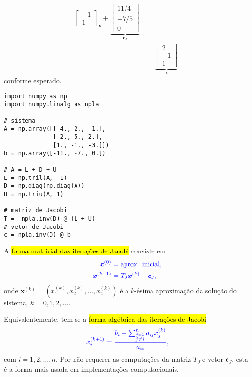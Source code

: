 \begin{ex}
\begin{align}
{\begin{bmatrix}
        -1 \\
        1             
      \end{bmatrix}}_{\pmb{x}} +
      \underbrace{\begin{bmatrix}
       11/4 \\
       -7/5 \\
       0
      \end{bmatrix}}_{\pmb{c}_J}\\
  &= \underbrace{\begin{bmatrix}
        2 \\
        -1 \\
        1             
      \end{bmatrix}}_{\pmb{x}}.
  \end{align}
  conforme esperado.

\begin{lstlisting}
import numpy as np
import numpy.linalg as npla

# sistema
A = np.array([[-4., 2., -1.],
              [-2., 5., 2.],
              [1., -1., -3.]])
b = np.array([-11., -7., 0.])

# A = L + D + U
L = np.tril(A, -1)
D = np.diag(np.diag(A))
U = np.triu(A, 1)

# matriz de Jacobi
T = -npla.inv(D) @ (L + U)
# vetor de Jacobi
c = npla.inv(D) @ b
\end{lstlisting}

\end{ex}

A \hl{forma matricial das iterações de Jacobi} consiste em
\begin{equation}\label{cap_sislin_sec_jgs:eq:iter_jacobi_mat}\color{blue}\begin{aligned}
  \pmb{x}^{(0)} &= \text{aprox. inicial},\\
  \pmb{x}^{(k+1)} &= T_J\pmb{x}^{(k)} + \pmb{c}_J,
\end{aligned}
\end{equation}
onde $\pmb{x}^{(k)} = (x_1^{(k)}, x_2^{(k)}, \dotsc, x_n^{(k)})$ é a $k$-ésima aproximação da solução do sistema, $k=0, 1, 2, \ldots$.

Equivalentemente, tem-se a \hl{forma algébrica das iterações de Jacobi}
\begin{equation}\color{blue}x_i^{(k+1)} = \frac{{b_i - \sum_{\overset{j=1}{j\neq i}}^n a_{ij}x_j^{(k)}}}{a_{ii}},
\end{equation}
com $i = 1, 2, \dotsc, n$. Por não requerer as computações da matriz $T_J$ e vetor $\pmb{c}_J$, esta é a forma mais usada em implementações computacionais.

